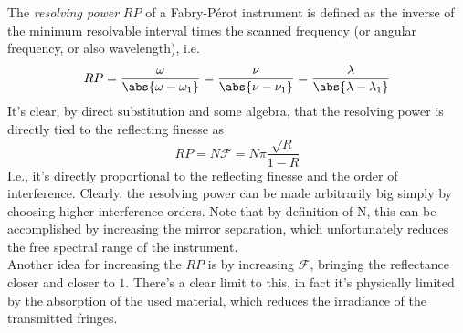 \documentclass[../electromagnetism.tex]{subfiles}
\begin{document}
\begin{dfn}
	The \emph{resolving power} $RP$ of a Fabry-Pérot instrument is defined as the inverse of the minimum resolvable interval times the scanned frequency (or angular frequency, or also wavelength), i.e.
	\begin{equation}
		RP=\frac{\omega}{\abs{\omega-\omega_1}}=\frac{\nu}{\abs{\nu-\nu_1}}=\frac{\lambda}{\abs{\lambda-\lambda_1}}
		\label{eq:resolvingpowerfpi}
	\end{equation}
	It's clear, by direct substitution and some algebra, that the resolving power is directly tied to the reflecting finesse as
	\begin{equation}
		RP=N\mathcal{F}=N\pi\frac{\sqrt{R}}{1-R}
		\label{eq:rpfcrossover}
	\end{equation}
	I.e., it's directly proportional to the reflecting finesse and the order of interference. Clearly, the resolving power can be made arbitrarily big simply by choosing higher interference orders. Note that by definition of N, this can be accomplished by increasing the mirror separation, which unfortunately reduces the free spectral range of the instrument.\\
	Another idea for increasing the $RP$ is by increasing $\mathcal{F}$, bringing the reflectance closer and closer to $1$. There's a clear limit to this, in fact it's physically limited by the absorption of the used material, which reduces the irradiance of the transmitted fringes.
\end{dfn}
\end{document}
